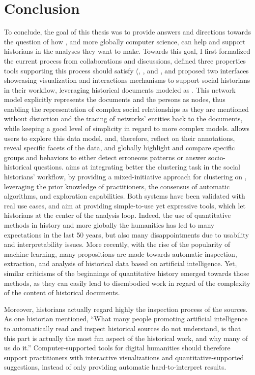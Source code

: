 \section{Conclusion}

To conclude, the goal of this thesis was to provide answers and directions towards the question of how \va, and more globally computer science, can help and support historians in the analyses they want to make.
Towards this goal, I first formalized the current \hsna process from collaborations and discussions, defined three properties tools supporting this process should satisfy (\traceability, \simplicity, and \reality, and proposed two interfaces showcasing visualization and interactions mechanisms to support social historians in their workflow, leveraging historical documents modeled as \modelplural.
This network model explicitly represents the documents and the persons as nodes, thus enabling the representation of complex social relationships as they are mentioned without distortion and the tracing of networks' entities back to the documents, while keeping a good level of simplicity in regard to more complex models.
\combinet allows users to explore this data model, and, therefore, reflect on their annotations, reveal specific facets of the data, and globally highlight and compare specific groups and behaviors to either detect erroneous patterns or answer socio-historical questions.
\pkclustering aims at integrating better the clustering task in the social historians' workflow, by providing a mixed-initiative approach for clustering on \modelplural, leveraging the prior knowledge of practitioners, the consensus of automatic algorithms, and exploration capabilities.
Both systems have been validated with real use cases, and aim at providing simple-to-use yet expressive tools, which let historians at the center of the analysis loop.
Indeed, the use of quantitative methods in history and more globally the humanities has led to many expectations in the last 50 years, but also many disappointments due to usability and interpretability issues.
More recently, with the rise of the popularity of machine learning, many propositions are made towards automatic inspection, extraction, and analysis of historical data based on artificial intelligence.
Yet, similar criticisms of the beginnings of quantitative history emerged towards those methods, as they can easily lead to disembodied work in regard of the complexity of the content of historical documents.


Moreover, historians actually regard highly the inspection process of the sources.
As one historian mentioned, ``What many people promoting artificial intelligence to automatically read and inspect historical sources do not understand, is that this part is actually the most fun aspect of the historical work, and why many of us do it.''
Computer-supported tools for digital humanities should therefore support practitioners with interactive visualizations and quantitative-supported suggestions, instead of only providing automatic hard-to-interpret results.

